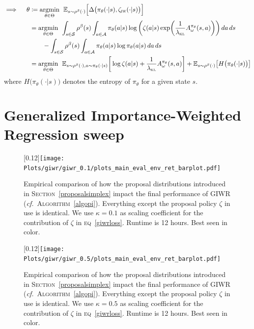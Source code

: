 \begin{align}
  \implies \quad
  \theta &\coloneqq
  \operatorname*{\arg\!\min}_{\theta \in \Theta} \;\,
  \mathbb{E}_{s \sim \rho^\beta(\cdot)}
  \Big[
  \Delta\big(\pi_\theta(\cdot | s), \zeta_\textsc{iw}(\cdot | s)\big)
  \Big]
  \\
  &= \operatorname*{\arg\!\min}_{\theta \in \Theta} \;\,
  \int_{s \in \mathcal{S}} \rho^\beta(s) \int_{a \in \mathcal{A}}
  \pi_\theta(a | s)
  \log \bigg(\zeta(a | s) \exp (\frac{1}{\lambda_\textsc{kl}} A^{\pi_\theta}_\omega(s,a))\bigg) \, da \, ds
  \nonumber \\
  & \qquad -
  \int_{s \in \mathcal{S}} \rho^\beta(s) \int_{a \in \mathcal{A}} \pi_\theta(a | s)
  \log \pi_\theta(a | s) \, da \, ds
  \\
  &= \operatorname*{\arg\!\min}_{\theta \in \Theta} \;\,
  \mathbb{E}_{s \sim \rho^\beta(\cdot), a \sim \pi_\theta(\cdot | s)}
  \bigg[
  \log \zeta(a | s) + \frac{1}{\lambda_\textsc{kl}} A^{\pi_\theta}_\omega(s,a)
  \bigg]
  + \mathbb{E}_{s \sim \rho^\beta(\cdot)} \big[H\big(\pi_\theta(\cdot | s)\big)\big]
\end{align}
where $H\big(\pi_\theta(\cdot | s)\big)$ denotes the entropy of $\pi_\theta$ for a given state $s$.

\section{Generalized Importance-Weighted Regression sweep}
\label{giwrsweep}

\begin{figure}[H]
  \center\scalebox{0.12}[0.12]{\texttt{[image: Plots/giwr/giwr\_0.1/plots\_main\_eval\_env\_ret\_barplot.pdf]}}
  \caption{Empirical comparison of how the proposal distributions introduced
  in \textsc{Section}~\ref{proposalsimplex}
  impact the final performance of GIWR (\textit{cf.}~\textsc{Algorithm}~\ref{algopi}).
  Everything except the proposal policy $\zeta$ in use is identical.
  We use $\kappa=0.1$ as scaling coefficient for the contribution of $\zeta$
  in \textsc{eq}~\ref{giwrloss}.
  Runtime is 12 hours. Best seen in color.}
  \label{giwr01:barplot}
\end{figure}
\begin{figure}[H]
  \center\scalebox{0.12}[0.12]{\texttt{[image: Plots/giwr/giwr\_0.5/plots\_main\_eval\_env\_ret\_barplot.pdf]}}
  \caption{Empirical comparison of how the proposal distributions introduced
  in \textsc{Section}~\ref{proposalsimplex}
  impact the final performance of GIWR (\textit{cf.}~\textsc{Algorithm}~\ref{algopi}).
  Everything except the proposal policy $\zeta$ in use is identical.
  We use $\kappa=0.5$ as scaling coefficient for the contribution of $\zeta$
  in \textsc{eq}~\ref{giwrloss}.
  Runtime is 12 hours. Best seen in color.}
  \label{giwr05:barplot}
\end{figure}

